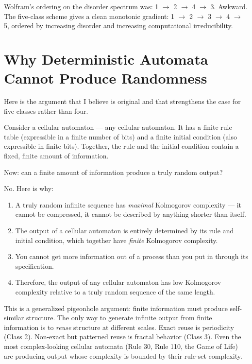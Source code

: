 \documentclass[11pt, twoside, openright]{book}
\begin{document}
Wolfram's ordering on the disorder spectrum was: 1 $\rightarrow$ 2 $\rightarrow$ 4 $\rightarrow$ 3. Awkward. The five-class scheme gives a clean monotonic gradient: 1 $\rightarrow$ 2 $\rightarrow$ 3 $\rightarrow$ 4 $\rightarrow$ 5, ordered by increasing disorder and increasing computational irreducibility.

\section*{Why Deterministic Automata Cannot Produce Randomness}

Here is the argument that I believe is original and that strengthens the case for five classes rather than four.

Consider a cellular automaton --- any cellular automaton. It has a finite rule table (expressible in a finite number of bits) and a finite initial condition (also expressible in finite bits). Together, the rule and the initial condition contain a fixed, finite amount of information.

Now: can a finite amount of information produce a truly random output?

No. Here is why:

\begin{enumerate}
  \item A truly random infinite sequence has \textit{maximal} Kolmogorov complexity --- it cannot be compressed, it cannot be described by anything shorter than itself.
  \item The output of a cellular automaton is entirely determined by its rule and initial condition, which together have \textit{finite} Kolmogorov complexity.
  \item You cannot get more information out of a process than you put in through its specification.
  \item Therefore, the output of any cellular automaton has low Kolmogorov complexity relative to a truly random sequence of the same length.
\end{enumerate}

This is a generalized pigeonhole argument: finite information must produce self-similar structure. The only way to generate infinite output from finite information is to \textit{reuse} structure at different scales. Exact reuse is periodicity (Class 2). Non-exact but patterned reuse is fractal behavior (Class 3). Even the most complex-looking cellular automata (Rule 30, Rule 110, the Game of Life) are producing output whose complexity is bounded by their rule-set complexity.
\end{document}
